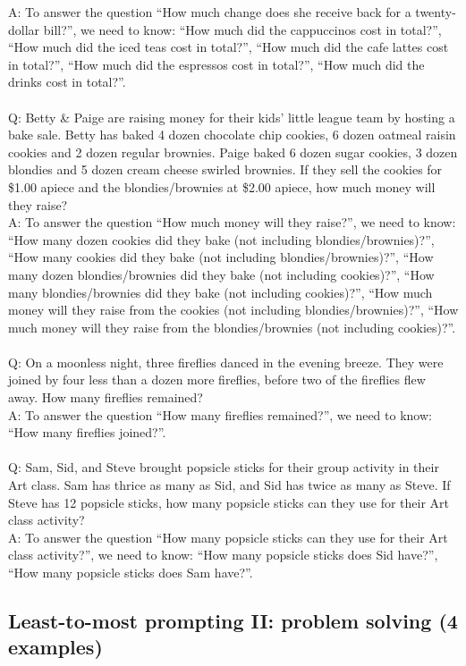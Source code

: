 A: To answer the question ``How much change does she receive back for a twenty-dollar bill?'', we need to know: ``How much did the cappuccinos cost in total?'', ``How much did the iced teas cost in total?'', ``How much did the cafe lattes cost in total?'', ``How much did the espressos cost in total?'', ``How much did the drinks cost in total?''. \\
 \\
Q: Betty \& Paige are raising money for their kids' little league team by hosting a bake sale. Betty has baked 4 dozen chocolate chip cookies, 6 dozen oatmeal raisin cookies and 2 dozen regular brownies. Paige baked 6 dozen sugar cookies, 3 dozen blondies and 5 dozen cream cheese swirled brownies. If they sell the cookies for \$1.00 apiece and the blondies/brownies at \$2.00 apiece, how much money will they raise? \\
A: To answer the question ``How much money will they raise?'', we need to know: ``How many dozen cookies did they bake (not including blondies/brownies)?'', ``How many cookies did they bake (not including blondies/brownies)?'', ``How many dozen blondies/brownies did they bake (not including cookies)?'', ``How many blondies/brownies did they bake (not including cookies)?'', ``How much money will they raise from the cookies (not including blondies/brownies)?'', ``How much money will they raise from the blondies/brownies (not including cookies)?''. \\
 \\
Q: On a moonless night, three fireflies danced in the evening breeze. They were joined by four less than a dozen more fireflies, before two of the fireflies flew away. How many fireflies remained? \\
A: To answer the question ``How many fireflies remained?'', we need to know: ``How many fireflies joined?''. \\
 \\
Q: Sam, Sid, and Steve brought popsicle sticks for their group activity in their Art class. Sam has thrice as many as Sid, and Sid has twice as many as Steve. If Steve has 12 popsicle sticks, how many popsicle sticks can they use for their Art class activity? \\
A: To answer the question ``How many popsicle sticks can they use for their Art class activity?'', we need to know: ``How many popsicle sticks does Sid have?'', ``How many popsicle sticks does Sam have?''. \\

\noindent
\subsection{Least-to-most prompting II: problem solving (4 examples)}

